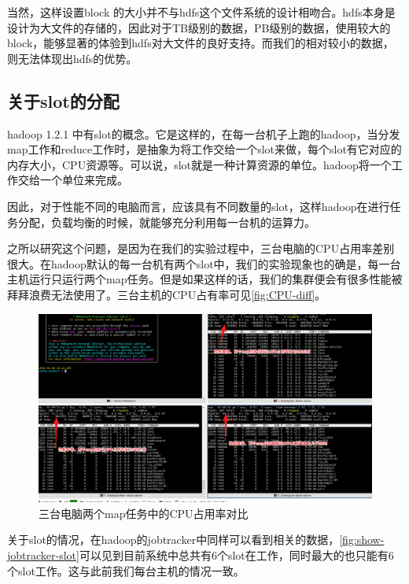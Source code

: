 \documentclass[forprint]{myreport}
\begin{document}
当然，这样设置block 的大小并不与hdfs这个文件系统的设计相吻合。hdfs本身是设计为大文件的存储的，因此对于TB级别的数据，PB级别的数据，使用较大的block，能够显著的体验到hdfs对大文件的良好支持。而我们的相对较小的数据，则无法体现出hdfs的优势。


\subsection{关于slot的分配}

hadoop 1.2.1 中有slot的概念。它是这样的，在每一台机子上跑的hadoop，当分发map工作和reduce工作时，是抽象为将工作交给一个slot来做，每个slot有它对应的内存大小，CPU资源等。可以说，slot就是一种计算资源的单位。hadoop将一个工作交给一个单位来完成。

因此，对于性能不同的电脑而言，应该具有不同数量的slot，这样hadoop在进行任务分配，负载均衡的时候，就能够充分利用每一台机的运算力。

之所以研究这个问题，是因为在我们的实验过程中，三台电脑的CPU占用率差别很大。在hadoop默认的每一台机有两个slot中，我们的实验现象也的确是，每一台主机运行只运行两个map任务。但是如果这样的话，我们的集群便会有很多性能被拜拜浪费无法使用了。三台主机的CPU占有率可见\autoref{fig:CPU-diff}。

\begin{figure}[htp]
  \centering
  \includegraphics[width=13cm]{"./figure/2018-07-03-15-06-19.png"}
  \caption{三台电脑两个map任务中的CPU占用率对比}
  \label{fig:CPU-diff}
\end{figure}

关于slot的情况，在hadoop的jobtracker中同样可以看到相关的数据，\autoref{fig:show-jobtracker-slot}可以见到目前系统中总共有6个slot在工作，同时最大的也只能有6个slot工作。这与此前我们每台主机的情况一致。
\end{document}
